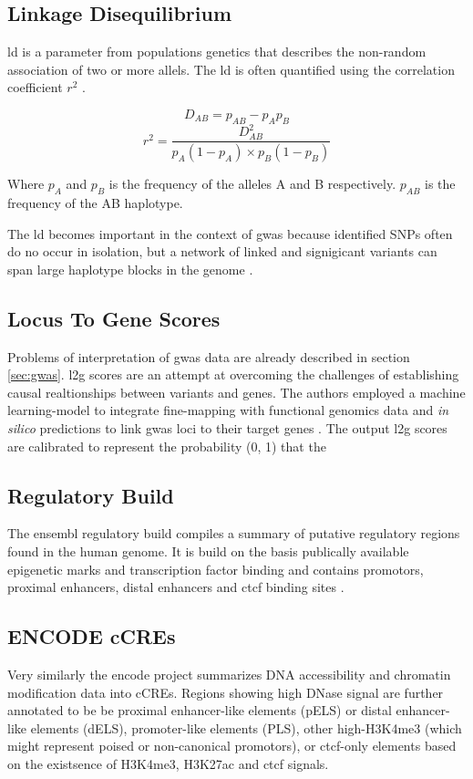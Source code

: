     \subsection{Linkage Disequilibrium}
    \Ac{ld} is a parameter from populations genetics that describes the non-random association of two or more allels. The \ac{ld} is often quantified using the correlation coefficient $r^2$ \cite{slatkinLinkageDisequilibriumUnderstanding2008}.

    $$ D_{AB} = p_{AB} − p_A p_B $$
    $$ r^2 = \frac{D_{AB}^2}{p_A (1-p_A) \times p_B (1-p_B)} $$

    Where $p_A$ and $p_B$ is the frequency of the alleles A and B respectively. $p_{AB}$ is the frequency of the AB haplotype.

    The \ac{ld} becomes important in the context of \ac{gwas} because identified SNPs often do no occur in isolation, but a network of linked and signigicant variants can span large haplotype blocks in the genome \cite{slatkinLinkageDisequilibriumUnderstanding2008}.

    \subsection{Locus To Gene Scores}
    Problems of interpretation of \ac{gwas} data are already described in section \ref{sec:gwas}. \ac{l2g} scores are an attempt at overcoming the challenges of establishing causal realtionships between variants and genes. The authors employed a machine learning-model to integrate fine-mapping with functional genomics data and \textit{in silico} predictions to link \ac{gwas} loci to their target genes \cite{mountjoyOpenApproachSystematically2021}. The output \ac{l2g} scores are calibrated to represent the probability (0, 1) that the

    \subsection{Regulatory Build}
    The ensembl regulatory build compiles a summary of putative regulatory regions found in the human genome. It is build on the basis publically available epigenetic marks and transcription factor binding and contains promotors, proximal enhancers, distal enhancers and \ac{ctcf} binding sites \cite{zerbinoEnsemblRegulatoryBuild2015}.

    \subsection{ENCODE \acp{cCRE}}
    Very similarly the \ac{encode} project summarizes DNA accessibility and chromatin modification data into \acp{cCRE}. Regions showing high DNase signal are further annotated to be be proximal enhancer-like elements (pELS) or distal enhancer-like elements (dELS), promoter-like elements (PLS), other high-H3K4me3 (which might represent poised or non-canonical promotors), or \ac{ctcf}-only elements based on the existsence of H3K4me3, H3K27ac and \ac{ctcf} signals.
    \cite{SCREENSearchCandidate, mooreExpandedEncyclopaediasDNA2020}

